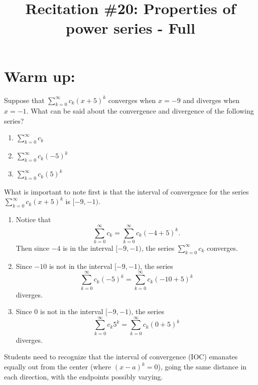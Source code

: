 \documentclass[]{ximera}
\title{Recitation \#20: Properties of power series - Full}
\begin{document}
\begin{abstract}		\end{abstract}
\maketitle



\section{Warm up:}
Suppose that $\sum_{k=0}^\infty c_k (x+5)^k$ converges when $x=-9$ and diverges when $x=-1$.  
What can be said about the convergence and divergence of the following series?
	\begin{multicols}{3}
	\begin{enumerate}
	\item  $\sum_{k=0}^\infty c_k$
	\item  $\sum_{k=0}^\infty c_k (-5)^k$
	\item  $\sum_{k=0}^\infty c_k (5)^k$
	\end{enumerate}
	\end{multicols}
	
	\begin{freeResponse}
	 What is important to note first is that the interval of convergence for the series $\sum_{k=0}^\infty c_k (x+5)^k$ is $[-9,-1)$. 
	
	\begin{enumerate}
	\item  Notice that
		\[
		\sum_{k=0}^\infty c_k = \sum_{k=0}^\infty c_k (-4+5)^k.
		\]
	Then since $-4$ is in the interval $[-9,-1)$, the series $\sum_{k=0}^\infty c_k$ converges.
	
	\item  Since $-10$ is not in the interval $[-9,-1)$, the series
		\[
		 \sum_{k=0}^\infty c_k (-5)^k = \sum_{k=0}^\infty c_k (-10+5)^k
		\]
	diverges.
	
	\item  Since $0$ is not in the interval $[-9,-1)$, the series
		\[
		\sum_{k=0}^\infty c_k 5^k = \sum_{k=0}^\infty c_k (0+5)^k
		\]
	diverges.
	\end{enumerate}
	\end{freeResponse}
	
\begin{instructorNotes}
Students need to recognize that the interval of convergence (IOC) emanates equally out from the center (where $(x-a)^k = 0$), going the same distance in each direction, with the endpoints possibly varying.
\end{instructorNotes}
\end{document}
